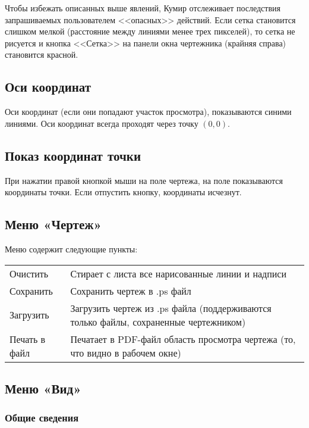 Чтобы избежать описанных выше явлений, Кумир отслеживает последствия запрашиваемых пользователем <<опасных>> действий. Если сетка становится слишком мелкой (расстояние между линиями менее трех пикселей), то сетка не рисуется и кнопка <<Сетка>> на панели  окна чертежника (крайняя справа) становится красной.

\subsection{Оси координат}

Оси координат (если они попадают участок просмотра), показываются синими линиями. Оси координат всегда проходят через точку $(0,0)$.

\subsection{Показ координат точки}

При нажатии правой кнопкой мыши на поле чертежа, на поле показываются координаты точки. Если отпустить кнопку, координаты исчезнут.

\subsection[Меню ''Чертеж'']{Меню «Чертеж»}

Меню содержит следующие пункты:
\begin{center}
\begin{tabular}{||p{3cm}|p{12.5cm}||}
\hline
\hline
Очистить &
Стирает с листа все нарисованные линии и надписи\\
Сохранить &
Сохранить чертеж в .ps файл\\
Загрузить &
Загрузить чертеж из .ps файла (поддерживаются только файлы, сохраненные чертежником)\\
Печать в файл &
Печатает в PDF-файл область просмотра чертежа (то, что видно в рабочем окне)\\
\hline
\hline
\end{tabular}
\end{center}

\subsection[Меню ''Вид'']{Меню «Вид»}

\subsubsection{Общие сведения}

